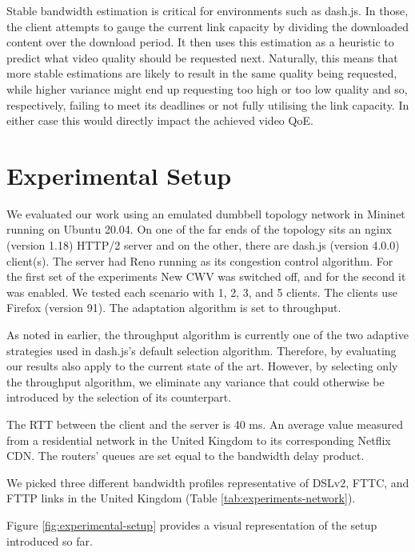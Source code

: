 \documentclass[10pt,sigconf]{acmart}
\begin{document}
Stable bandwidth estimation is critical for environments such as dash.js. In those, the client attempts to gauge the current link capacity by dividing the downloaded content over the download period. It then uses this estimation as a heuristic to predict what video quality should be requested next. Naturally, this means that more stable estimations are likely to result in the same quality being requested, while higher variance might end up requesting too high or too low quality and so, respectively, failing to meet its deadlines or not fully utilising the link capacity. In either case this would directly impact the achieved video QoE.


\section{Experimental Setup}

We evaluated our work using an emulated dumbbell topology network in Mininet running on Ubuntu 20.04. On one of the far ends of the topology sits an nginx (version 1.18) HTTP/2 server and on the other, there are dash.js (version 4.0.0) client(s). The server had Reno running as its congestion control algorithm. For the first set of the experiments New CWV was switched off, and for the second it was enabled. We tested each scenario with 1, 2, 3, and 5 clients.  The clients use Firefox (version 91). The adaptation algorithm is set to throughput. 

As noted in earlier, the throughput algorithm is currently one of the two adaptive strategies used in dash.js's default selection algorithm. Therefore, by evaluating our results also apply to the current state of the art. However, by selecting only the throughput algorithm, we eliminate any variance that could otherwise be introduced by the selection of its counterpart. 

The RTT between the client and the server is 40 ms. An average value measured from a residential network in the United Kingdom to its corresponding Netflix CDN. The routers' queues are set equal to the bandwidth delay product.

We picked three different bandwidth profiles representative of DSLv2, FTTC, and FTTP links in the United Kingdom \cite{online-ofcom-report} (Table \ref{tab:experiments-network}).

Figure \ref{fig:experimental-setup} provides a visual representation of the setup introduced so far.
\end{document}
